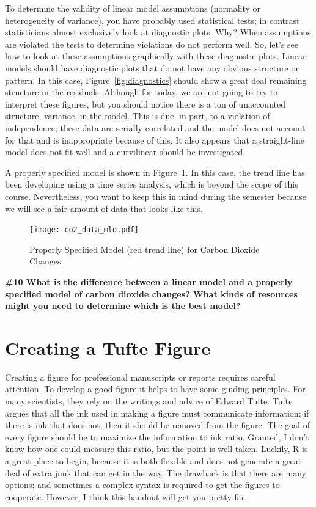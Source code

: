 \documentclass{tufte-handout}\usepackage[]{graphicx}\usepackage[]{color}
\begin{document}
To determine the validity of linear model assumptions (\eg normality or heterogeneity of variance), you have probably used statistical tests; in contrast statisticians almost exclusively look at diagnostic plots. Why?  When assumptions are violated the tests to determine violations do not perform well. So, let's see how to look at these assumptions graphically with these diagnostic plots. Linear models should have diagnostic plots that do not have any obvious structure or pattern. In this case, Figure~\ref{fig:diagnostics} should show a great deal remaining structure in the residuals. Although for today, we are not going to try to interpret these figures, but you should notice there is a ton of unaccounted structure, \ie variance, in the model. This is due, in part, to a violation of independence; these data are serially correlated and the model does not account for that and is inappropriate because of this. It also appears that a straight-line model does not fit well and a curvilinear should be investigated. 

A properly specified model is shown in Figure~\ref{fig:co2_data_mlo}. In this case, the trend line has been developing using a time series analysis, which is beyond the scope of this course. Nevertheless, you want to keep this in mind during the semester because we will see a fair amount of data that looks like this.

\begin{figure}
	\texttt{[image: co2\_data\_mlo.pdf]}
	\caption{Properly Specified Model (red trend line) for Carbon Dioxide Changes}
	\label{fig:co2_data_mlo}
\end{figure}

\bigskip
\noindent \textbf{\#10 What is the difference between a linear model and a properly specified model of carbon dioxide changes?  What kinds of resources might you need to determine which is the best model?}

\section{Creating a Tufte Figure}

Creating a figure for professional manuscripts or reports requires careful attention. To develop a good figure it helps to have some guiding principles. For many scientists, they rely on the writings and advice of Edward Tufte. Tufte argues that all the ink used in making a figure must communicate information; if there is ink that does not, then it should be removed from the figure. The goal of every figure should be to maximize the information to ink ratio. Granted, I don't know how one could measure this ratio, but the point is well taken. Luckily, R is a great place to begin, because it is both flexible and does not generate a great deal of extra junk that can get in the way. The drawback is that there are many options; and sometimes a complex syntax is required to get the figures to cooperate. However, I think this handout will get you pretty far.  
\end{document}
